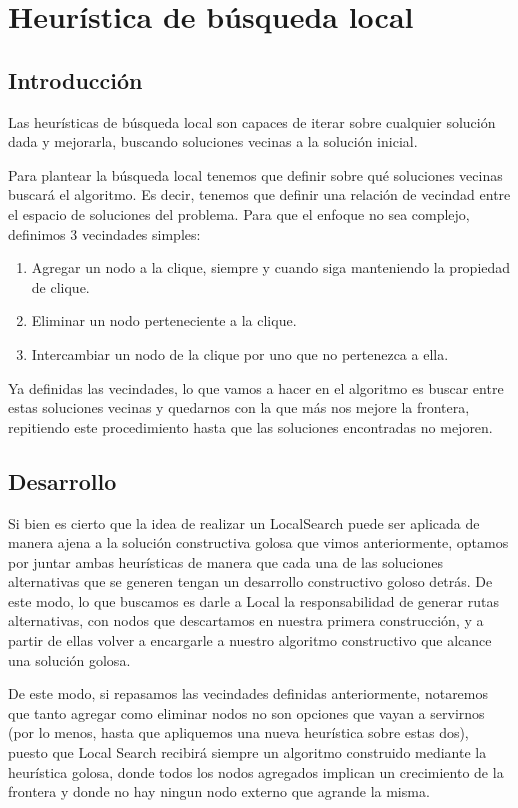 \section{Heurística de búsqueda local}
\subsection{Introducción}
Las heurísticas de búsqueda local son capaces de iterar sobre cualquier solución dada y
mejorarla, buscando soluciones vecinas a la solución inicial.

Para plantear la búsqueda local tenemos que definir sobre qué soluciones vecinas buscará el algoritmo. Es decir, tenemos que definir una relación de vecindad entre el espacio de soluciones del problema. Para que el enfoque no sea complejo, definimos 3 vecindades simples:

\begin{enumerate}
	\item Agregar un nodo a la clique, siempre y cuando siga manteniendo la propiedad de clique.

	\item Eliminar un nodo perteneciente a la clique.

	\item Intercambiar un nodo de la clique por uno que no pertenezca a ella.

\end{enumerate}

Ya definidas las vecindades, lo que vamos a hacer en el algoritmo es buscar entre estas soluciones vecinas y quedarnos con la que más nos mejore la frontera, repitiendo este procedimiento hasta que las soluciones encontradas no mejoren.


\subsection{Desarrollo}
Si bien es cierto que la idea de realizar un LocalSearch puede ser aplicada de manera ajena a la solución constructiva golosa que vimos anteriormente, optamos por juntar ambas heurísticas de manera que cada una de las soluciones alternativas que se generen tengan un desarrollo constructivo goloso detrás. De este modo, lo que buscamos es darle a Local la responsabilidad de generar rutas alternativas, con nodos que descartamos en nuestra primera construcción, y a partir de ellas volver a encargarle a nuestro algoritmo constructivo que alcance una solución golosa.

De este modo, si repasamos las vecindades definidas anteriormente, notaremos que tanto agregar como eliminar nodos no son opciones que vayan a servirnos (por lo menos, hasta que apliquemos una nueva heurística sobre estas dos), puesto que Local Search recibirá siempre un algoritmo construido mediante la heurística golosa, donde todos los nodos agregados implican un crecimiento de la frontera y donde no hay ningun nodo externo que agrande la misma.

